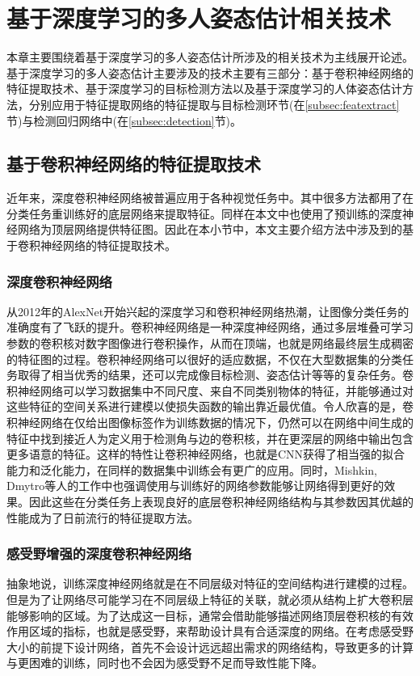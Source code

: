 \chapter{基于深度学习的多人姿态估计相关技术}
\label{cha:basicfacts}
本章主要围绕着基于深度学习的多人姿态估计所涉及的相关技术为主线展开论述。基于深度学习的多人姿态估计主要涉及的技术主要有三部分：基于卷积神经网络的特征提取技术、基于深度学习的目标检测方法以及基于深度学习的人体姿态估计方法，分别应用于特征提取网络的特征提取与目标检测环节(在\ref{subsec:featextract}节)与检测回归网络中(在\ref{subsec:detection}节)。
\section{基于卷积神经网络的特征提取技术}
近年来，深度卷积神经网络被普遍应用于各种视觉任务中。其中很多方法都用了在分类任务重训练好的底层网络来提取特征。同样在本文中也使用了预训练的深度神经网络为顶层网络提供特征图。因此在本小节中，本文主要介绍方法中涉及到的基于卷积神经网络的特征提取技术。
\subsection{深度卷积神经网络}
\label{subsec:factsfeature}
从2012年的AlexNet\cite{alex2012alexnet}开始兴起的深度学习和卷积神经网络热潮，让图像分类任务的准确度有了飞跃的提升。卷积神经网络是一种深度神经网络，通过多层堆叠可学习参数的卷积核对数字图像进行卷积操作，从而在顶端，也就是网络最终层生成稠密的特征图的过程。卷积神经网络可以很好的适应数据，不仅在大型数据集的分类任务取得了相当优秀的结果，还可以完成像目标检测、姿态估计等等的复杂任务。卷积神经网络可以学习数据集中不同尺度、来自不同类别物体的特征，并能够通过对这些特征的空间关系进行建模以使损失函数的输出靠近最优值。令人欣喜的是，卷积神经网络在仅给出图像标签作为训练数据的情况下，仍然可以在网络中间生成的特征中找到接近人为定义用于检测角与边的卷积核，并在更深层的网络中输出包含更多语意的特征\cite{yosinski2015understanding}。这样的特性让卷积神经网络，也就是CNN获得了相当强的拟合能力和泛化能力，在同样的数据集中训练会有更广的应用。同时，Mishkin, Dmytro等人的工作中\cite{mishkin2015all}也强调使用与训练好的网络参数能够让网络得到更好的效果。因此这些在分类任务上表现良好的底层卷积神经网络结构与其参数因其优越的性能成为了日前流行的特征提取方法。
\subsection{感受野增强的深度卷积神经网络}
\label{subsec:factsdeepextract}
抽象地说，训练深度神经网络就是在不同层级对特征的空间结构进行建模的过程。但是为了让网络尽可能学习在不同层级上特征的关联，就必须从结构上扩大卷积层能够影响的区域。为了达成这一目标，通常会借助能够描述网络顶层卷积核的有效作用区域的指标，也就是感受野，来帮助设计具有合适深度的网络。在考虑感受野大小的前提下设计网络，首先不会设计远远超出需求的网络结构，导致更多的计算与更困难的训练，同时也不会因为感受野不足而导致性能下降。

